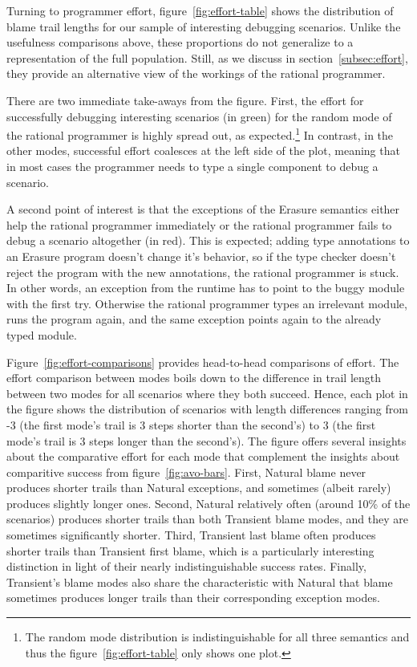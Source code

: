 Turning to programmer effort, figure~\ref{fig:effort-table} shows the distribution of blame trail lengths
for our sample of interesting debugging scenarios. Unlike the usefulness
comparisons above, these proportions do not generalize to a representation of the full population.
Still, as we discuss in section~\ref{subsec:effort}, they provide an
alternative view of the workings of the rational programmer. 

There are
two immediate take-aways from the figure. First, the effort for successfully
debugging interesting scenarios (in green) for the random mode of the
rational programmer is highly spread out, as expected.\footnote{The
random mode distribution is indistinguishable for all three semantics and thus the figure~\ref{fig:effort-table} 
only shows one plot.} In contrast, in the other modes, successful effort coalesces at
the left side of the plot, meaning that in most cases the programmer needs
to type a single component to debug a scenario. 

A second point of interest is that the exceptions of
the Erasure semantics either help the rational programmer immediately or 
the rational programmer fails to debug a scenario altogether (in red).
This is expected; adding type annotations to an Erasure program doesn't
change it's behavior, so if the type checker doesn't reject the
program with the new annotations, the rational programmer is stuck.
In other words, an
exception from the runtime has to point to the buggy module with
the first try. Otherwise the rational programmer types an irrelevant
module, runs the program again, and the same exception points again to the
already typed module. 

Figure~\ref{fig:effort-comparisons} provides head-to-head comparisons of
effort.  The effort comparison between modes boils down to the
difference in trail length between two modes for all scenarios where they
both succeed.  Hence, each plot in the figure shows the distribution of
scenarios with length differences ranging from -3 (the first mode's trail
is 3 steps shorter than the second's) to 3 (the first mode's trail is 3
steps longer than the second's).  The figure offers several insights about
the comparative effort for each mode that complement the insights about
comparitive success from figure~\ref{fig:avo-bars}.  First, Natural blame
never produces shorter trails than Natural exceptions, and sometimes
(albeit rarely) produces slightly longer ones.  Second, Natural relatively
often (around 10\% of the scenarios) produces shorter trails than both
Transient blame modes, and they are sometimes significantly shorter.
Third, Transient last blame often produces shorter trails than Transient
first blame, which is a particularly interesting distinction in light of
their nearly indistinguishable success rates.  Finally, Transient's blame
modes also share the characteristic with Natural that blame sometimes
produces longer trails than their corresponding exception modes.

